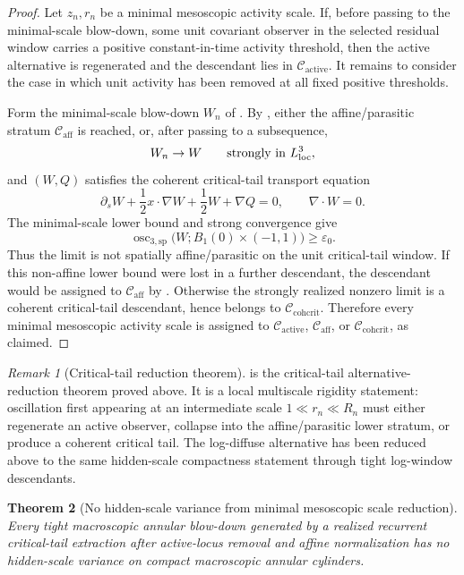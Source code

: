 \documentclass[11pt]{amsart}
\numberwithin{equation}{section}
\theoremstyle{plain}
\newtheorem{theorem}{Theorem}[section]
\theoremstyle{definition}
\theoremstyle{remark}
\newtheorem{remark}[theorem]{Remark}
\newcommand{\loc}{\mathrm{loc}}
\newcommand{\Cactive}{\mathcal C_{\mathrm{active}}}
\newcommand{\Caff}{\mathcal C_{\mathrm{aff}}}
\newcommand{\Ccohcrit}{\mathcal C_{\mathrm{cohcrit}}}
\newcommand{\oscsp}{\operatorname{osc}_{3,\mathrm{sp}}}
\begin{document}
\begin{proof}
Let \(z_n,r_n\) be a minimal mesoscopic activity scale.  If, before passing to the
minimal-scale blow-down, some unit covariant observer in the selected residual
window carries a positive constant-in-time activity threshold, then the
active alternative is regenerated and the descendant lies in \(\Cactive\).  It remains to
consider the case in which unit activity has been removed at all fixed positive
thresholds.

Form the minimal-scale blow-down \(W_n\) of
.  By
, either the affine/parasitic stratum
\(\Caff\) is reached, or, after passing to a subsequence,
\[
   W_n\to W
   \qquad\hbox{strongly in }L^3_{\loc},
\]
and \((W,Q)\) satisfies the coherent critical-tail transport equation
\[
   \partial_sW+\frac12x\cdot\nabla W+\frac12W+\nabla Q=0,
   \qquad \nabla\cdot W=0 .
\]
The minimal-scale lower bound and strong convergence give
\[
   \oscsp\bigl(W;B_1(0)\times(-1,1)\bigr)
   \ge \varepsilon_0 .
\]
Thus the limit is not spatially affine/parasitic on the unit critical-tail
window.  If this non-affine lower bound were lost in a further descendant, the
descendant would be assigned to \(\Caff\) by
.  Otherwise the strongly realized
nonzero limit is a coherent critical-tail descendant, hence belongs to
\(\Ccohcrit\).  Therefore every minimal mesoscopic activity scale is assigned to
\(\Cactive\), \(\Caff\), or \(\Ccohcrit\), as claimed.
\end{proof}

\begin{remark}[Critical-tail reduction theorem]
\label{rem:remaining-hidden-scale-input}
 is the critical-tail alternative-reduction
theorem proved above.  It is a local multiscale rigidity statement: oscillation
first appearing at an intermediate scale
\(1\ll r_n\ll R_n\) must either regenerate an active observer, collapse into
the affine/parasitic lower stratum, or produce a coherent critical tail.  The
log-diffuse alternative has been reduced above to the same hidden-scale compactness
statement through tight log-window descendants.
\end{remark}

\begin{theorem}[No hidden-scale variance from minimal mesoscopic scale reduction]
\label{thm:no-hidden-scale-variance-realized-defects}
Every tight macroscopic
annular blow-down generated by a realized recurrent critical-tail extraction
after active-locus removal and affine normalization has no hidden-scale variance
on compact macroscopic annular cylinders.
\end{theorem}
\end{document}
